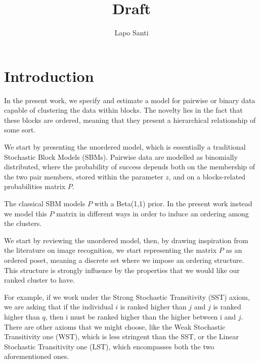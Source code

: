 \documentclass[11pt]{amsart}
\title{Draft}
\author{Lapo Santi}
\begin{document}
\maketitle
\tableofcontents

\newpage

\section{Introduction}

In the present work, we specify and estimate a model for pairwise or binary data capable of clustering the data  within blocks. The novelty lies in the fact that these blocks are ordered, meaning that they present a hierarchical relationship of some sort.

We start by presenting the unordered model, which is essentially a traditional Stochastic Block Models (SBMs). 
Pairwise data are modelled as binomially distributed, where the probability of success depends both on the membership of the two pair members, stored within the parameter $z$, and on a blocks-related probabilities matrix $P$.

The classical SBM models $P$ with a Beta(1,1) prior. In the present work instead we model this $P$ matrix in different ways in order to induce an ordering among the clusters.

We start by reviewing the unordered model, then, by drawing inspiration from the literature on image recognition, we start representing the matrix $P$ as an ordered poset, meaning a discrete set where we impose an ordering structure. This structure is strongly influence by the properties that we would like our ranked cluster to have. 

For example, if we work under the Strong Stochastic Transitivity (SST) axiom, we are asking that if the individual $i$ is ranked higher than $j$ and $j$ is ranked higher than $q$, then i must be ranked higher than the higher between i and $j$. There are other axioms that we might choose, like the Weak Stochastic Transitivity one (WST), which is less stringent than the SST, or the Linear Stochastic Transitivity one (LST), which encompasses both the two aforementioned ones.
\end{document}
